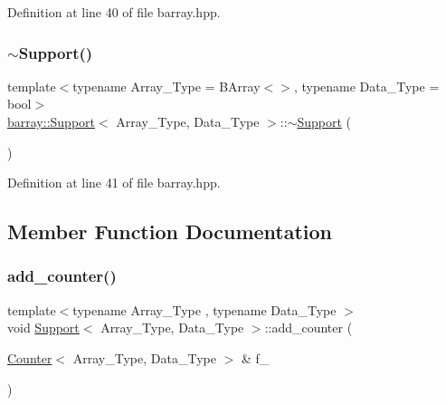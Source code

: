 Definition at line 40 of file barray.\+hpp.

\mbox{\label{classbarray_1_1_support_a6f632bd62775de61278f6bee2a656bcd}} 
\subsubsection{\texorpdfstring{$\sim$\+Support()}{~Support()}}
{\footnotesize\ttfamily template$<$typename Array\+\_\+\+Type  = B\+Array$<$$>$, typename Data\+\_\+\+Type  = bool$>$ \\
\hyperlink{classbarray_1_1_support}{barray\+::\+Support}$<$ Array\+\_\+\+Type, Data\+\_\+\+Type $>$\+::$\sim$\hyperlink{classbarray_1_1_support}{Support} (\begin{DoxyParamCaption}{ }\end{DoxyParamCaption})\hspace{0.3cm}{\ttfamily [inline]}}



Definition at line 41 of file barray.\+hpp.



\subsection{Member Function Documentation}
\mbox{\label{classbarray_1_1_support_a9fc89bd8b15dcad6a4140a3c74073d10}} 
\subsubsection{\texorpdfstring{add\+\_\+counter()}{add\_counter()}}
{\footnotesize\ttfamily template$<$typename Array\+\_\+\+Type , typename Data\+\_\+\+Type $>$ \\
void \hyperlink{classbarray_1_1_support}{Support}$<$ Array\+\_\+\+Type, Data\+\_\+\+Type $>$\+::add\+\_\+counter (\begin{DoxyParamCaption}\item[{\hyperlink{classbarray_1_1_counter}{Counter}$<$ Array\+\_\+\+Type, Data\+\_\+\+Type $>$ \&}]{f\+\_\+ }\end{DoxyParamCaption})\hspace{0.3cm}{\ttfamily [inline]}}



